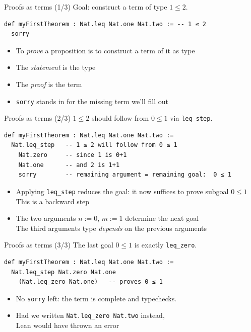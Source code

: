 \documentclass[aspectratio=169]{beamer}
\begin{document}
\begin{frame}[fragile]{Proofs as terms \hfill (1/3)}
  Goal: construct a term of type $1 \leq 2$.
\begin{lstlisting}
def myFirstTheorem : Nat.leq Nat.one Nat.two := -- 1 ≤ 2
  sorry
\end{lstlisting}
  \begin{itemize}
    \item To \emph{prove} a proposition is to \alert{construct a term} of it as type
    \item The \emph{statement} is the type
    \item The \emph{proof} is the term
    \item \texttt{sorry} stands in for the missing term we'll fill out
  \end{itemize}
\end{frame}

\begin{frame}[fragile]{Proofs as terms \hfill (2/3)}
  $1 \leq 2$ should follow from $0 \leq 1$ via \texttt{leq\_step}.
\begin{lstlisting}
def myFirstTheorem : Nat.leq Nat.one Nat.two :=
  Nat.leq_step   -- 1 ≤ 2 will follow from 0 ≤ 1
    Nat.zero     -- since 1 is 0+1
    Nat.one      -- and 2 is 1+1
    sorry        -- remaining argument = remaining goal:  0 ≤ 1
\end{lstlisting}
  \begin{itemize}
    \item Applying \texttt{leq\_step} reduces the goal:
          it now suffices to prove subgoal $0 \leq 1$
          \\This is a \alert{backward step}
    \item The two arguments  $n := 0$, $m := 1$ determine the next goal
    	  \\The third arguments type \textit{depends} on the previous arguments
  \end{itemize}
\end{frame}

\begin{frame}[fragile]{Proofs as terms \hfill (3/3)}
  The last goal $0 \leq 1$ is exactly \texttt{leq\_zero}.
\begin{lstlisting}
def myFirstTheorem : Nat.leq Nat.one Nat.two :=
  Nat.leq_step Nat.zero Nat.one
    (Nat.leq_zero Nat.one)   -- proves 0 ≤ 1
\end{lstlisting}
  \begin{itemize}
    \item No \texttt{sorry} left: the term is complete and typechecks.
    \item Had we written \texttt{Nat.leq\_zero Nat.two} instead, 
       \\Lean would have thrown an error
  \end{itemize}
\end{frame}
\end{document}
